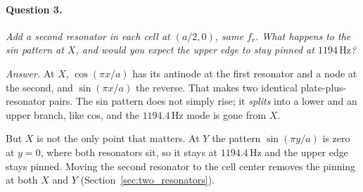 \paragraph{Question 3.} \emph{Add a second resonator in each cell at $(a/2, 0)$, same
$f_r$. What happens to the sin pattern at $X$, and would you expect the upper edge to
stay pinned at $1194\,\mathrm{Hz}$?}

\emph{Answer.} At $X$, $\cos(\pi x/a)$ has its antinode at the first resonator and a
node at the second, and $\sin(\pi x/a)$ the reverse. That makes two identical
plate-plus-resonator pairs. The sin pattern does not simply rise; it \emph{splits}
into a lower and an upper branch, like cos, and the $1194.4\,\mathrm{Hz}$ mode is
gone from $X$.

But $X$ is not the only point that matters. At $Y$ the pattern $\sin(\pi y/a)$ is
zero at $y = 0$, where both resonators sit, so it stays at $1194.4\,\mathrm{Hz}$ and
the upper edge stays pinned. Moving the second resonator to the cell center removes
the pinning at both $X$ and $Y$ (Section~\ref{sec:two_resonators}).
